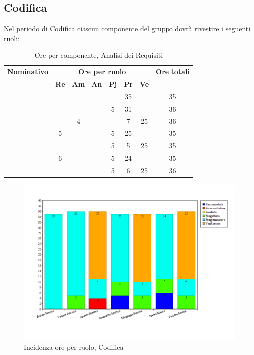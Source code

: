 \subsection{Codifica}
Nel periodo di Codifica ciascun componente del gruppo dovrà rivestire i seguenti ruoli:
\begin{table}[H]
	\begin{center}
		\begin{tabular}{|c|c|c|c|c|c|c|c|}
			\hline
			\textbf{Nominativo} & \multicolumn{6}{c|}{\textbf{Ore per ruolo}} & \textbf{Ore totali} \\
			& \textbf{Re} & \textbf{Am} & \textbf{An} & \textbf{Pj} & \textbf{Pr} & \textbf{Ve} & \\
			\hline
			\FB		&		&		&		&		&	35	&		&	35	\\
			\hline	
			\AF		&		&		&		&	 5	&	31	&		& 	36	\\
			\hline		
			\GN		&		&	4	&		&		&	7	&	25	&	36	\\
			\hline						
			\GR	&	5	&	 	&		&	5	&	25 	& 		&	35	\\
			\hline
			\SM 		&		&		&		&	5	&	5	& 	25	&	35	\\
			\hline
			\MP 		& 	6	&		&		&	5	&	24	&		&	35	\\
			\hline
			\MV 		&		&		&		&	5	&	6	&	25	& 	36	\\
			\hline			
		\end{tabular}
	\end{center}
	\caption{Ore per componente, Analisi dei Requisiti}
\end{table}

\begin{figure}[H]
	\centering
	\includegraphics[scale=0.4]{immagini/Grafi/GrafoCod}
	\caption{Incidenza ore per ruolo, Codifica}
\end{figure}

